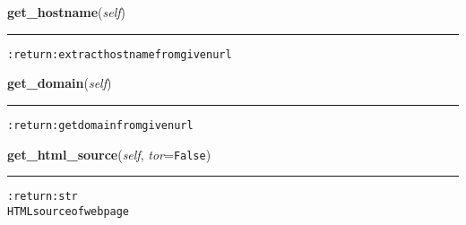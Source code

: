     \vspace{0.5ex}

\hspace{.8\funcindent}\begin{boxedminipage}{\funcwidth}

    \raggedright \textbf{get\_hostname}(\textit{self})

    \vspace{-1.5ex}

    \rule{\textwidth}{0.5\fboxrule}
\setlength{\parskip}{2ex}
\begin{alltt}

:return: extract hostname from given url
\end{alltt}

\setlength{\parskip}{1ex}
    \end{boxedminipage}

    \label{hal:internet:web:Webpage:get_domain}

    \vspace{0.5ex}

\hspace{.8\funcindent}\begin{boxedminipage}{\funcwidth}

    \raggedright \textbf{get\_domain}(\textit{self})

    \vspace{-1.5ex}

    \rule{\textwidth}{0.5\fboxrule}
\setlength{\parskip}{2ex}
\begin{alltt}

:return: get domain from given url
\end{alltt}

\setlength{\parskip}{1ex}
    \end{boxedminipage}

    \label{hal:internet:web:Webpage:get_html_source}

    \vspace{0.5ex}

\hspace{.8\funcindent}\begin{boxedminipage}{\funcwidth}

    \raggedright \textbf{get\_html\_source}(\textit{self}, \textit{tor}={\tt False})

    \vspace{-1.5ex}

    \rule{\textwidth}{0.5\fboxrule}
\setlength{\parskip}{2ex}
\begin{alltt}

:return: str
    HTML source of webpage
\end{alltt}

\setlength{\parskip}{1ex}
    \end{boxedminipage}

